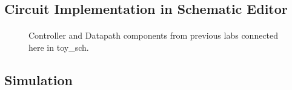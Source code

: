 \documentclass[12pt]{article}
\begin{document}
		
\newpage
	\subsection{Circuit Implementation in Schematic Editor}
		\paragraph*{}
			
		\begin{figure}[h]
			\caption{Controller and Datapath components from previous labs connected here in toy\_sch.}
		\end{figure}
		
		\newpage
	\subsection{Simulation}
		
\end{document}
